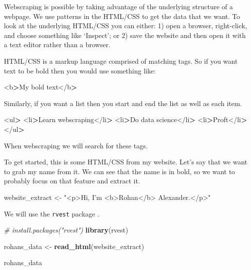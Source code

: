 \documentclass[
]{book}
\newenvironment{Shaded}{\begin{snugshade}}{\end{snugshade}}
\newcommand{\CommentTok}[1]{\textcolor[rgb]{0.56,0.35,0.01}{\textit{#1}}}
\newcommand{\KeywordTok}[1]{\textcolor[rgb]{0.13,0.29,0.53}{\textbf{#1}}}
\newcommand{\NormalTok}[1]{#1}
\newcommand{\OperatorTok}[1]{\textcolor[rgb]{0.81,0.36,0.00}{\textbf{#1}}}
\newcommand{\StringTok}[1]{\textcolor[rgb]{0.31,0.60,0.02}{#1}}
\begin{document}
Webscraping is possible by taking advantage of the underlying structure of a webpage. We use patterns in the HTML/CSS to get the data that we want. To look at the underlying HTML/CSS you can either: 1) open a browser, right-click, and choose something like `Inspect'; or 2) save the website and then open it with a text editor rather than a browser.

HTML/CSS is a markup language comprised of matching tags. So if you want text to be bold then you would use something like:

\begin{Shaded}
\begin{Highlighting}[]
\NormalTok{<b}\OperatorTok{>}\NormalTok{My bold text</b}\OperatorTok{>}
\end{Highlighting}
\end{Shaded}

Similarly, if you want a list then you start and end the list as well as each item.

\begin{Shaded}
\begin{Highlighting}[]
\NormalTok{<ul}\OperatorTok{>}
\NormalTok{  <li}\OperatorTok{>}\NormalTok{Learn webscraping</li}\OperatorTok{>}
\NormalTok{  <li}\OperatorTok{>}\NormalTok{Do data science</li}\OperatorTok{>}
\NormalTok{  <li}\OperatorTok{>}\NormalTok{Proft</li}\OperatorTok{>}
\NormalTok{</ul}\OperatorTok{>}
\end{Highlighting}
\end{Shaded}

When webscraping we will search for these tags.

To get started, this is some HTML/CSS from my website. Let's say that we want to grab my name from it. We can see that the name is in bold, so we want to probably focus on that feature and extract it.

\begin{Shaded}
\begin{Highlighting}[]
\NormalTok{website_extract <-}\StringTok{ "<p>Hi, I’m <b>Rohan</b> Alexander.</p>"}
\end{Highlighting}
\end{Shaded}

We will use the \texttt{rvest} package \citet{citervest}.

\begin{Shaded}
\begin{Highlighting}[]
\CommentTok{# install.packages("rvest")}
\KeywordTok{library}\NormalTok{(rvest)}

\NormalTok{rohans_data <-}\StringTok{ }\KeywordTok{read_html}\NormalTok{(website_extract)}

\NormalTok{rohans_data}
\end{Highlighting}
\end{Shaded}
\end{document}
